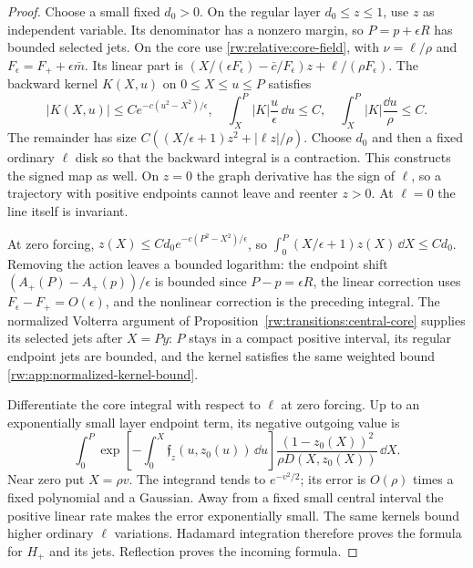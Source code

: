 \begin{proof}
Choose a small fixed $d_0>0$. On the regular layer $d_0\le z\le1$,
use $z$ as independent variable. Its denominator has a nonzero margin,
so $P=p+\epsilon R$ has bounded selected jets.
On the core use \eqref{rw:relative:core-field}, with
$\nu=\ell/\rho$ and $F_\epsilon=F_++\epsilon\bar m$.
Its linear part is
$(X/(\epsilon F_\epsilon)-\bar c/F_\epsilon)z
 +\ell/(\rho F_\epsilon)$.
The backward kernel $K(X,u)$ on $0\le X\le u\le P$ satisfies
\[
 |K(X,u)|\le Ce^{-c(u^2-X^2)/\epsilon},\quad
 \int_X^P|K|\frac u\epsilon\,\dd u\le C,
 \quad \int_X^P|K|\frac{\dd u}{\rho}\le C.
\]
The remainder has size
$C((X/\epsilon+1)z^2+|\ell z|/\rho)$.
Choose $d_0$ and then a fixed ordinary $\ell$ disk so that the
backward integral is a contraction. This constructs the signed map
as well. On $z=0$ the graph derivative has the sign of $\ell$, so
a trajectory with positive endpoints cannot leave and reenter $z>0$.
At $\ell=0$ the line itself is invariant.

At zero forcing,
$z(X)\le Cd_0e^{-c(P^2-X^2)/\epsilon}$, so
$\int_0^P(X/\epsilon+1)z(X)\,\dd X\le Cd_0$.
Removing the action leaves a bounded logarithm: the endpoint shift
$(A_+(P)-A_+(p))/\epsilon$ is bounded since $P-p=\epsilon R$,
the linear correction uses $F_\epsilon-F_+=O(\epsilon)$, and the
nonlinear correction is the preceding integral.
The normalized Volterra argument of
Proposition~\ref{rw:transitions:central-core} supplies its selected
jets after $X=Py$: $P$ stays in a compact positive interval, its
regular endpoint jets are bounded, and the kernel satisfies the same
weighted bound \eqref{rw:app:normalized-kernel-bound}.

Differentiate the core integral with respect to $\ell$ at zero
forcing. Up to an exponentially small layer endpoint term, its
negative outgoing value is
\[
 \int_0^P
 \exp\left[-\int_0^X \mathfrak f_z(u,z_0(u))\,\dd u\right]
 \frac{(1-z_0(X))^2}{\rho D(X,z_0(X))}\,\dd X.
\]
Near zero put $X=\rho v$. The integrand tends to $e^{-v^2/2}$;
its error is $O(\rho)$ times a fixed polynomial and a Gaussian.
Away from a fixed small central interval the positive linear rate
makes the error exponentially small. The same kernels bound higher
ordinary $\ell$ variations. Hadamard integration therefore proves
the formula for $H_+$ and its jets. Reflection proves the incoming
formula.


\end{proof}
